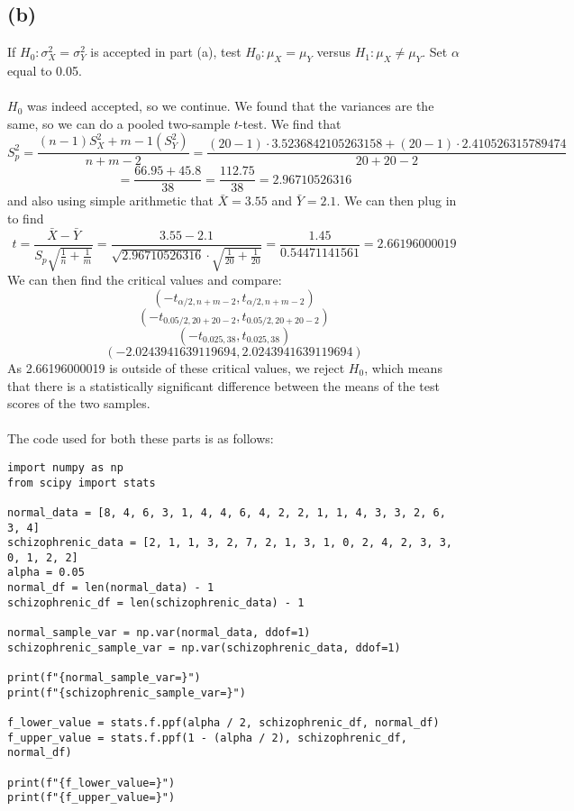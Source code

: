 \documentclass{article}
\begin{document}
{\subsection*{(b)}
If \(H_0: \sigma^2_X = \sigma^2_Y\) is accepted in part (a), test \(H_0: \mu_X = \mu_Y\) versus \(H_1: \mu_X \neq \mu_Y\). Set \(\alpha\) equal to 0.05.
\\
\\
\(H_0\) was indeed accepted, so we continue. We found that the variances are the same, so we can do a pooled two-sample \(t\)-test. We find that 
\[
S^2_p = \frac{(n-1)S^2_X + m-1(S^2_Y)}{n + m - 2} = \frac{(20 - 1) \cdot 3.5236842105263158 + (20 - 1) \cdot 2.410526315789474}{20 + 20 - 2}
\]
\[
= \frac{66.95 + 45.8}{38} = \frac{112.75}{38} = 2.96710526316
\]
and also using simple arithmetic that \(\bar{X} = 3.55\) and \(\bar{Y} = 2.1\). We can then plug in to find 
\[
t = \frac{\bar{X} - \bar{Y}}{S_p \sqrt{\frac{1}{n} + \frac{1}{m}}} = \frac{3.55 - 2.1}{\sqrt{2.96710526316} \cdot \sqrt{\frac{1}{20} + \frac{1}{20}}} = \frac{1.45}{0.54471141561} = 2.66196000019
\]
We can then find the critical values and compare:
\[
(-t_{\alpha / 2, n + m - 2}, t_{\alpha / 2, n + m - 2})
\]
\[
(-t_{0.05 / 2, 20 + 20 - 2}, t_{0.05 / 2, 20 + 20 - 2})
\]
\[
(-t_{0.025, 38}, t_{0.025, 38})
\]
\[
(-2.0243941639119694, 2.0243941639119694)
\]
As 2.66196000019 is outside of these critical values, we reject \(H_0\), which means that there is a statistically significant difference between the means of the test scores of the two samples.
\\
\\
The code used for both these parts is as follows:
\begin{verbatim}
import numpy as np
from scipy import stats

normal_data = [8, 4, 6, 3, 1, 4, 4, 6, 4, 2, 2, 1, 1, 4, 3, 3, 2, 6, 3, 4]
schizophrenic_data = [2, 1, 1, 3, 2, 7, 2, 1, 3, 1, 0, 2, 4, 2, 3, 3, 0, 1, 2, 2]
alpha = 0.05
normal_df = len(normal_data) - 1
schizophrenic_df = len(schizophrenic_data) - 1

normal_sample_var = np.var(normal_data, ddof=1)
schizophrenic_sample_var = np.var(schizophrenic_data, ddof=1)

print(f"{normal_sample_var=}")
print(f"{schizophrenic_sample_var=}")

f_lower_value = stats.f.ppf(alpha / 2, schizophrenic_df, normal_df)
f_upper_value = stats.f.ppf(1 - (alpha / 2), schizophrenic_df, normal_df)

print(f"{f_lower_value=}")
print(f"{f_upper_value=}")


\end{verbatim}}
\end{document}
